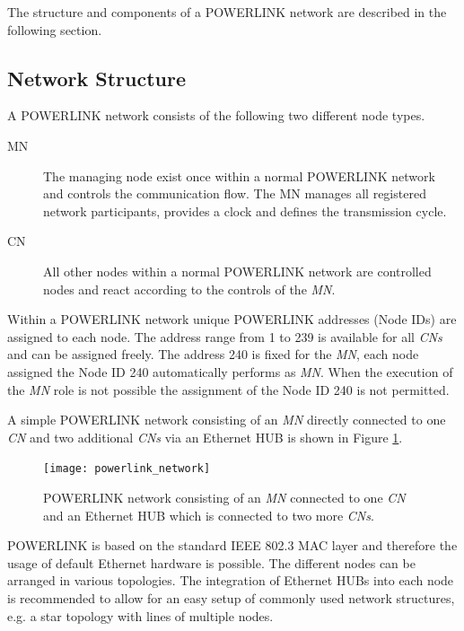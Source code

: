 The structure and components of a POWERLINK network are described in the following section.

\subsection{Network Structure}
\label{sec:oplk_powerlink_network}
A POWERLINK network consists of the following two different node types.

\begin{description}
    \item[MN] The managing node exist once within a normal POWERLINK network and controls the communication flow.
    The MN manages all registered network participants, provides a clock and defines the transmission cycle.
    \item[CN] All other nodes within a normal POWERLINK network are controlled nodes and react according to the controls of the \emph{MN}.
\end{description}

Within a POWERLINK network unique POWERLINK addresses (Node IDs) are assigned to each node.
The address range from 1 to 239 is available for all \emph{CNs} and can be assigned freely.
The address 240 is fixed for the \emph{MN}, each node assigned the Node ID 240 automatically performs as \emph{MN}.
When the execution of the \emph{MN} role is not possible the assignment of the Node ID 240 is not permitted.
\cite{epsg_epsg_2013}

A simple POWERLINK network consisting of an \emph{MN} directly connected to one \emph{CN} and two additional \emph{CNs} via an Ethernet HUB is shown in Figure \ref{fig:powerlink_network}.

\begin{figure}
    \centering
    \texttt{[image: powerlink\_network]}
    \caption{POWERLINK network consisting of an \emph{MN} connected to one \emph{CN} and an Ethernet HUB which is connected to two more \emph{CNs}.}
    \label{fig:powerlink_network}
\end{figure}

POWERLINK is based on the standard IEEE 802.3 MAC layer and therefore the usage of default Ethernet hardware is possible.
The different nodes can be arranged in various topologies.
The integration of Ethernet HUBs into each node is recommended to allow for an easy setup of commonly used network structures, e.g. a star topology with lines of multiple nodes. \cite[chapter 3]{epsg_epsg_2013} %

